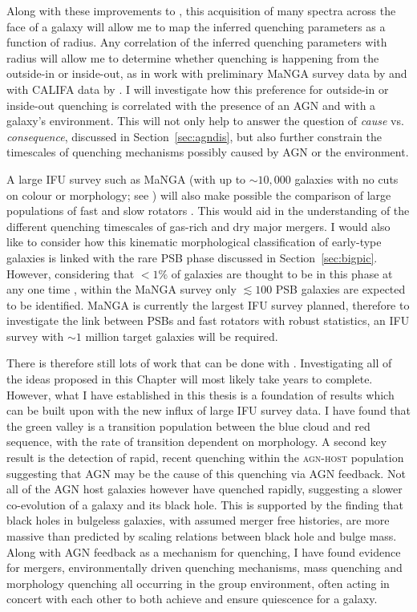 Along with these improvements to \starpy, this acquisition of many spectra across the face of a galaxy will allow me to map the inferred quenching parameters as a function of radius. Any correlation of the inferred quenching parameters with radius will allow me to determine whether quenching is happening from the outside-in \citep[i.e. quenching due to environmental mechanisms, as in][]{pan15, clarke16, schaefer17} or inside-out, as in work with preliminary MaNGA survey data by \citet{belfiore16} and with CALIFA data by \citet{gonzalez16}. I will investigate how this preference for outside-in or inside-out quenching is correlated with the presence of an AGN and with a galaxy's environment. This will not only help to answer the question of \emph{cause} vs. \emph{consequence}, discussed in Section~\ref{sec:agndis}, but also further constrain the timescales of quenching mechanisms possibly caused by AGN or the environment. 

A large IFU survey such as MaNGA (with up to $\sim10,000$ galaxies with no cuts on colour or morphology; see \citealt{bundy15}) will also make possible the comparison of large populations of fast and slow rotators \citep[see work with the first results from MaNGA by][]{penny16}. This would aid in the understanding of the different quenching timescales of gas-rich and dry major mergers. I would also like to consider how this kinematic morphological classification of early-type galaxies is linked with the rare PSB phase discussed in Section~\ref{sec:bigpic}. However, considering that $<1\%$ of galaxies are thought to be in this phase at any one time \citep{Wong12, wild16}, within the MaNGA survey only $\lesssim100$ PSB galaxies are expected to be identified. MaNGA is currently the largest IFU survey planned, therefore to investigate the link between PSBs and fast rotators with robust statistics, an IFU survey with $\sim 1$ million target galaxies will be required. 

There is therefore still lots of work that can be done with \starpy. Investigating all of the ideas proposed in this Chapter will most likely take years to complete. However, what I have established in this thesis is a foundation of results which can be built upon with the new influx of large IFU survey data. I have found that the green valley is a transition population between the blue cloud and red sequence, with the rate of transition dependent on morphology. A second key result is the detection of rapid, recent quenching within the \textsc{agn-host} population suggesting that AGN may be the cause of this quenching via AGN feedback. Not all of the AGN host galaxies however have quenched rapidly, suggesting a slower co-evolution of a galaxy and its black hole. This is supported by the finding that black holes in bulgeless galaxies, with assumed merger free histories, are more massive than predicted by scaling relations between black hole and bulge mass. Along with AGN feedback as a mechanism for quenching, I have found evidence for mergers, environmentally driven quenching mechanisms, mass quenching and morphology quenching all occurring in the group environment, often acting in concert with each other to both achieve and ensure quiescence for a galaxy. 

